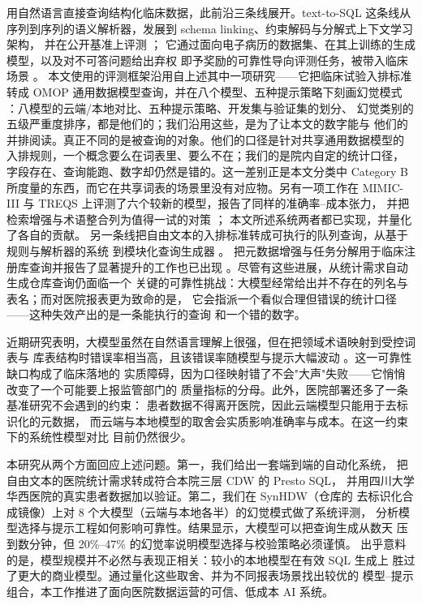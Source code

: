 \documentclass[11pt,a4paper]{article}
\begin{document}
用自然语言直接查询结构化临床数据，此前沿三条线展开。text-to-SQL 这条线从
序列到序列的语义解析器，发展到 schema linking、约束解码与分解式上下文学习架构，
并在公开基准上评测 \cite{zhong2017,yu2018,wang2020,scholak2021,pourreza2023,bird2023,dailsql2024,macsql2024}；
它通过面向电子病历的数据集、在其上训练的生成模型，以及对不可答问题给出弃权
即予奖励的可靠性导向评测任务，被带入临床场景
\cite{treqs2020,medts2021,ehrsql2024,ragepi2024,rag2step2025}。
本文使用的评测框架沿用自上述其中一项研究——它把临床试验入排标准转成
OMOP 通用数据模型查询，并在八个模型、五种提示策略下刻画幻觉模式
\cite{lee2025}：八模型的云端/本地对比、五种提示策略、开发集与验证集的划分、
幻觉类别的五级严重度排序，都是他们的；我们沿用这些，是为了让本文的数字能与
他们的并排阅读。真正不同的是被查询的对象。他们的口径是针对共享通用数据模型的
入排规则，一个概念要么在词表里、要么不在；我们的是院内自定的统计口径，
字段存在、查询能跑、数字却仍然是错的。这一差别正是本文分类中 Category B
所度量的东西，而它在共享词表的场景里没有对应物。另有一项工作在
MIMIC-III 与 TREQS 上评测了六个较新的模型，报告了同样的准确率--成本张力，
并把检索增强与术语整合列为值得一试的对策 \cite{tankovic2025}；
本文所述系统两者都已实现，并量化了各自的贡献。
另一条线把自由文本的入排标准转成可执行的队列查询，从基于规则与解析器的系统
到模块化查询生成器 \cite{c2q2019,trialpath2021,leafai2023}。
把元数据增强与任务分解用于临床注册库查询并报告了显著提升的工作也已出现
\cite{metaclin2025}。尽管有这些进展，从统计需求自动生成仓库查询仍面临一个
关键的可靠性挑战：大模型经常给出并不存在的列名与表名；而对医院报表更为致命的是，
它会指派一个看似合理但错误的统计口径——这种失效产出的是一条能执行的查询
和一个错的数字。

近期研究表明，大模型虽然在自然语言理解上很强，但在把领域术语映射到受控词表与
库表结构时错误率相当高，且该错误率随模型与提示大幅波动
\cite{halluc2024,ragstruct2024,chang2024}。这一可靠性缺口构成了临床落地的
实质障碍，因为口径映射错了不会"大声"失败——它悄悄改变了一个可能要上报监管部门的
质量指标的分母。此外，医院部署还多了一条基准研究不会遇到的约束：
患者数据不得离开医院，因此云端模型只能用于去标识化的元数据，
而云端与本地模型的取舍会实质影响准确率与成本。在这一约束下的系统性模型对比
目前仍然很少。

本研究从两个方面回应上述问题。第一，我们给出一套端到端的自动化系统，
把自由文本的医院统计需求转成符合本院三层 CDW 的 Presto SQL，
并用四川大学华西医院的真实患者数据加以验证。第二，我们在 SynHDW（仓库的
去标识化合成镜像）上对 8 个大模型（云端与本地各半）的幻觉模式做了系统评测，
分析模型选择与提示工程如何影响可靠性。结果显示，大模型可以把查询生成从数天
压到数分钟，但 20\%--47\% 的幻觉率说明模型选择与校验策略必须谨慎。
出乎意料的是，模型规模并不必然与表现正相关：较小的本地模型在有效 SQL 生成上
胜过了更大的商业模型。通过量化这些取舍、并为不同报表场景找出较优的
模型--提示组合，本工作推进了面向医院数据运营的可信、低成本 AI 系统。
\end{document}
